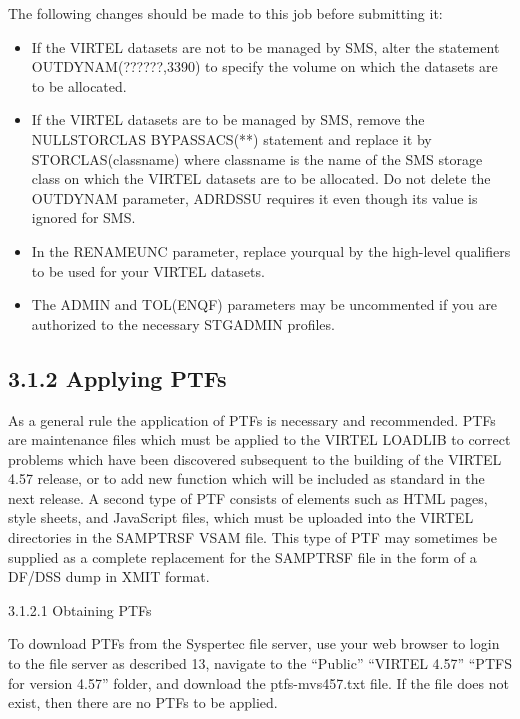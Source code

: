 \documentclass[letterpaper,10pt,english]{sphinxmanual}
\begin{document}
The following changes should be made to this job before submitting it:
\begin{itemize}
\item {} 
If the VIRTEL datasets are not to be managed by SMS, alter the statement OUTDYNAM(??????,3390) to specify the volume on which the datasets are to be allocated.

\item {} 
If the VIRTEL datasets are to be managed by SMS, remove the NULLSTORCLAS BYPASSACS(**) statement and replace it by STORCLAS(classname) where classname is the name of the SMS storage class on which the VIRTEL datasets are to be allocated. Do not delete the OUTDYNAM parameter, ADRDSSU requires it even though its value is ignored for SMS.

\item {} 
In the RENAMEUNC parameter, replace yourqual by the high-level qualifiers to be used for your VIRTEL datasets.

\item {} 
The ADMIN and TOL(ENQF) parameters may be uncommented if you are authorized to the necessary STGADMIN profiles.

\end{itemize}


\subsection{3.1.2 Applying PTFs}
\label{\detokenize{Installation_Guide:applying-ptfs}}
As a general rule the application of PTFs is necessary and recommended. PTFs are maintenance files which must be applied to the VIRTEL LOADLIB to correct problems which have been discovered subsequent to the building of the VIRTEL 4.57 release, or to add new function which will be included as standard in the next release. A second type of PTF consists of elements such as HTML pages, style sheets, and JavaScript files, which must be uploaded into the VIRTEL directories in the SAMPTRSF VSAM file. This type of PTF may sometimes be supplied as a complete replacement for the SAMPTRSF file in the form of a DF/DSS dump in XMIT format.

3.1.2.1 Obtaining PTFs

To download PTFs from the Syspertec file server, use your web browser to login to the file server as described 13, navigate to the “Public” \textendash{} “VIRTEL 4.57” \textendash{} “PTFS for version 4.57” folder, and download the ptfs-mvs457.txt file. If the file does not exist, then there are no PTFs to be applied.
\end{document}
